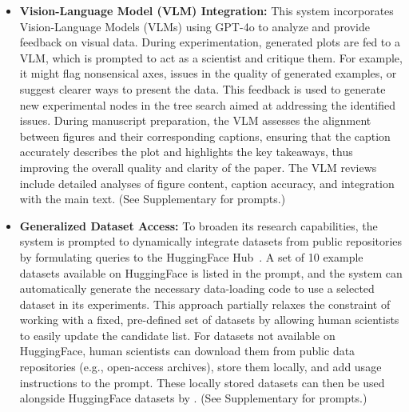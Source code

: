 \begin{itemize}
The structured design of experiment stages and tailored node types facilitates systematic exploration across all stages.
Unlike some LLM agents that rigidly follow predefined, fine-grained workflow graphs, the \ouralgo adopts a looser structure that guides the entire empirical research cycle, enabling flexible system behavior while maintaining coherence across iterative stages.
See Supplementary  and  for the prompts and detailed hyperparameters, respectively.

    
    \item \textbf{Vision-Language Model (VLM) Integration:} This system incorporates Vision-Language Models (VLMs) using GPT-4o 
    to analyze and provide feedback on visual data. During experimentation, generated plots are fed to a VLM, which is prompted to act as a scientist and critique them. 
    For example, it might flag nonsensical axes, issues in the quality of generated examples, or suggest clearer ways to present the data.
    This feedback is used to generate new experimental nodes in the tree search aimed at addressing the identified issues. During manuscript preparation, the VLM assesses the alignment between figures and their corresponding captions, ensuring that the caption accurately describes the plot and highlights the key takeaways, thus improving the overall quality and clarity of the paper. The VLM reviews include detailed analyses of figure content, caption accuracy, and integration with the main text.
    (See Supplementary  for prompts.)

    \item \textbf{Generalized Dataset Access:} 
    To broaden its research capabilities, the system is prompted to dynamically integrate datasets from public repositories by formulating queries to the HuggingFace Hub~\citep{wolf2020huggingface}. 
    A set of 10 example datasets available on HuggingFace is listed in the prompt, and the system can automatically generate the necessary data-loading code to use a selected dataset in its experiments. 
    This approach partially relaxes the constraint of working with a fixed, pre-defined set of datasets by allowing human scientists to easily update the candidate list.
    For datasets not available on HuggingFace, human scientists can download them from public data repositories (e.g., open-access archives), store them locally, and add usage instructions to the prompt. These locally stored datasets can then be used alongside HuggingFace datasets by \ouralgo.
    (See Supplementary  for prompts.)
    

\end{itemize}
